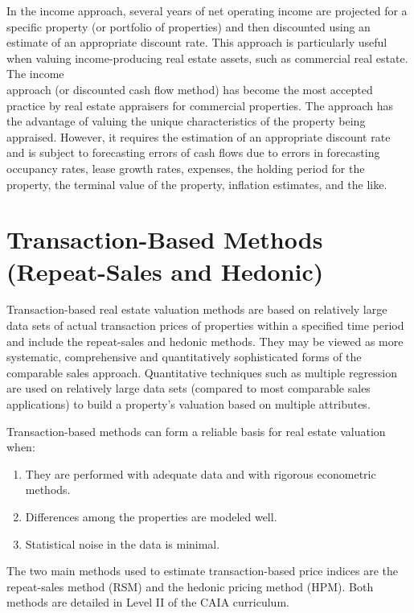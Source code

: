 \documentclass[11pt]{article}
\begin{document}
In the income approach, several years of net operating income are projected for a specific property (or portfolio of properties) and then discounted using an estimate of an appropriate discount rate. This approach is particularly useful when valuing income-producing real estate assets, such as commercial real estate. The income\\
approach (or discounted cash flow method) has become the most accepted practice by real estate appraisers for commercial properties. The approach has the advantage of valuing the unique characteristics of the property being appraised. However, it requires the estimation of an appropriate discount rate and is subject to forecasting errors of cash flows due to errors in forecasting occupancy rates, lease growth rates, expenses, the holding period for the property, the terminal value of the property, inflation estimates, and the like.

\section*{Transaction-Based Methods (Repeat-Sales and Hedonic)}
Transaction-based real estate valuation methods are based on relatively large data sets of actual transaction prices of properties within a specified time period and include the repeat-sales and hedonic methods. They may be viewed as more systematic, comprehensive and quantitatively sophisticated forms of the comparable sales approach. Quantitative techniques such as multiple regression are used on relatively large data sets (compared to most comparable sales applications) to build a property's valuation based on multiple attributes.

Transaction-based methods can form a reliable basis for real estate valuation when:

\begin{enumerate}
  \item They are performed with adequate data and with rigorous econometric methods.

  \item Differences among the properties are modeled well.

  \item Statistical noise in the data is minimal.

\end{enumerate}

The two main methods used to estimate transaction-based price indices are the repeat-sales method (RSM) and the hedonic pricing method (HPM). Both methods are detailed in Level II of the CAIA curriculum.
\end{document}
